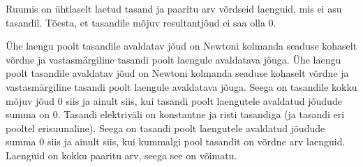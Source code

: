 
Ruumis on ühtlaselt laetud tasand ja paaritu arv võrdseid laenguid, mis ei asu tasandil. Tõesta, et tasandile mõjuv resultantjõud ei saa olla 0.


\hint
Ühe laengu poolt tasandile avaldatav jõud on Newtoni kolmanda seaduse kohaselt võrdne ja vastasmärgiline tasandi poolt laengule avaldatava jõuga.\solu
Ühe laengu poolt tasandile avaldatav jõud on Newtoni kolmanda seaduse kohaselt võrdne ja vastasmärgiline tasandi poolt laengule avaldatava jõuga. Seega on tasandile kokku mõjuv jõud 0 siis ja ainult siis, kui tasandi poolt laengutele avaldatud jõudude summa on 0. Tasandi elektriväli on konstantne ja risti tasandiga (ja tasandi eri pooltel erisuunaline). Seega on tasandi poolt laengutele avaldatud jõudude summa 0 siis ja ainult siis, kui kummalgi pool tasandit on võrdne arv laenguid. Laenguid on kokku paaritu arv, seega see on võimatu.\probend